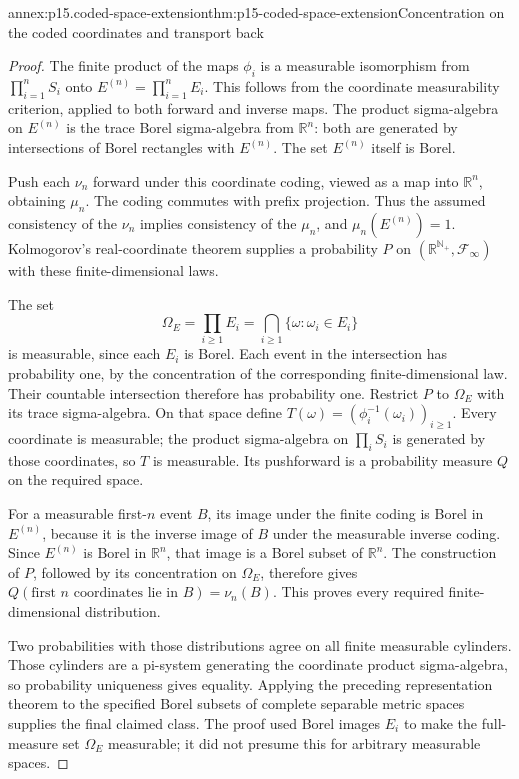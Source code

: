 \begin{annexitem}{annex:p15.coded-space-extension}{thm:p15-coded-space-extension}{Concentration on the coded coordinates and transport back}
\begin{proof}
The finite product of the maps \(\phi_i\) is a measurable
isomorphism from \(\prod_{i=1}^n S_i\) onto
\(E^{(n)}=\prod_{i=1}^nE_i\). This follows from the
coordinate measurability criterion, applied to both forward
and inverse maps. The product sigma-algebra on \(E^{(n)}\)
is the trace Borel sigma-algebra from \(\mathbb R^n\):
both are generated by intersections of Borel rectangles with
\(E^{(n)}\). The set \(E^{(n)}\) itself is Borel.

Push each \(\nu_n\) forward under this coordinate coding,
viewed as a map into \(\mathbb R^n\), obtaining \(\mu_n\).
The coding commutes with prefix projection. Thus the assumed
consistency of the \(\nu_n\) implies consistency of the
\(\mu_n\), and \(\mu_n(E^{(n)})=1\).
Kolmogorov's real-coordinate theorem supplies a probability
\(P\) on \((\mathbb R^{\mathbb N_+},\mathcal F_\infty)\)
with these finite-dimensional laws.

The set
\[
 \Omega_E=\prod_{i\geq1}E_i
          =\bigcap_{i\geq1}\{\omega:\omega_i\in E_i\}
\]
is measurable, since each \(E_i\) is Borel. Each event
in the intersection has probability one, by the concentration
of the corresponding finite-dimensional law. Their countable
intersection therefore has probability one. Restrict \(P\)
to \(\Omega_E\) with its trace sigma-algebra.
On that space define
\(T(\omega)=(\phi_i^{-1}(\omega_i))_{i\geq1}\).
Every coordinate is measurable; the product sigma-algebra on
\(\prod_i S_i\) is generated by those coordinates, so
\(T\) is measurable. Its pushforward is a probability measure
\(Q\) on the required space.

For a measurable first-\(n\) event \(B\), its image under
the finite coding is Borel in \(E^{(n)}\), because it is
the inverse image of \(B\) under the measurable inverse
coding. Since \(E^{(n)}\) is Borel in \(\mathbb R^n\),
that image is a Borel subset of \(\mathbb R^n\).
The construction of \(P\), followed by its concentration
on \(\Omega_E\), therefore gives
\(Q(\text{first }n\text{ coordinates lie in }B)=\nu_n(B)\).
This proves every required finite-dimensional distribution.

Two probabilities with those distributions agree on all finite
measurable cylinders. Those cylinders are a pi-system generating
the coordinate product sigma-algebra, so probability uniqueness
gives equality. Applying the preceding representation theorem
to the specified Borel subsets of complete separable metric
spaces supplies the final claimed class. The proof used Borel
images \(E_i\) to make the full-measure set \(\Omega_E\)
measurable; it did not presume this for arbitrary measurable spaces.
\end{proof}
\end{annexitem}
